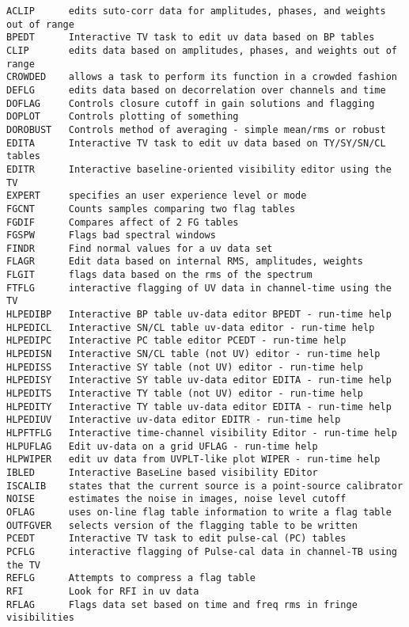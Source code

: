 \vskip 0.5pt
\bbve\begin{verbatim}
ACLIP      edits suto-corr data for amplitudes, phases, and weights out of range
BPEDT      Interactive TV task to edit uv data based on BP tables
CLIP       edits data based on amplitudes, phases, and weights out of range
CROWDED    allows a task to perform its function in a crowded fashion
DEFLG      edits data based on decorrelation over channels and time
DOFLAG     Controls closure cutoff in gain solutions and flagging
DOPLOT     Controls plotting of something
DOROBUST   Controls method of averaging - simple mean/rms or robust
EDITA      Interactive TV task to edit uv data based on TY/SY/SN/CL tables
EDITR      Interactive baseline-oriented visibility editor using the TV
EXPERT     specifies an user experience level or mode
FGCNT      Counts samples comparing two flag tables
FGDIF      Compares affect of 2 FG tables
FGSPW      Flags bad spectral windows
FINDR      Find normal values for a uv data set
FLAGR      Edit data based on internal RMS, amplitudes, weights
FLGIT      flags data based on the rms of the spectrum
FTFLG      interactive flagging of UV data in channel-time using the TV
HLPEDIBP   Interactive BP table uv-data editor BPEDT - run-time help
HLPEDICL   Interactive SN/CL table uv-data editor - run-time help
HLPEDIPC   Interactive PC table editor PCEDT - run-time help
HLPEDISN   Interactive SN/CL table (not UV) editor - run-time help
HLPEDISS   Interactive SY table (not UV) editor - run-time help
HLPEDISY   Interactive SY table uv-data editor EDITA - run-time help
HLPEDITS   Interactive TY table (not UV) editor - run-time help
HLPEDITY   Interactive TY table uv-data editor EDITA - run-time help
HLPEDIUV   Interactive uv-data editor EDITR - run-time help
HLPFTFLG   Interactive time-channel visibility Editor - run-time help
HLPUFLAG   Edit uv-data on a grid UFLAG - run-time help
HLPWIPER   edit uv data from UVPLT-like plot WIPER - run-time help
IBLED      Interactive BaseLine based visibility EDitor
ISCALIB    states that the current source is a point-source calibrator
NOISE      estimates the noise in images, noise level cutoff
OFLAG      uses on-line flag table information to write a flag table
OUTFGVER   selects version of the flagging table to be written
PCEDT      Interactive TV task to edit pulse-cal (PC) tables
PCFLG      interactive flagging of Pulse-cal data in channel-TB using the TV
REFLG      Attempts to compress a flag table
RFI        Look for RFI in uv data
RFLAG      Flags data set based on time and freq rms in fringe visibilities

\end{verbatim}

